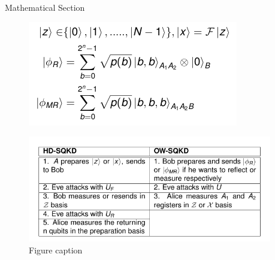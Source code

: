 \documentclass[final]{beamer}
\newlength{\onecolwid}
\newlength{\twocolwid}
\begin{document}
\begin{frame}[t]
\begin{columns}[t]
\begin{column}{\twocolwid}
\begin{columns}[t,totalwidth=\twocolwid]
\begin{column}{\onecolwid} %


\begin{block}{Mathematical Section}

\begin{figure}
	\includegraphics[width=.6\linewidth]{hd_eqns.png}
\end{figure}


\begin{figure}
	\includegraphics[width=\linewidth]{hd_v_ow.png}
	\caption{Figure caption}
\end{figure}


\end{block}


\end{column} %

\begin{column}{\onecolwid} %



\end{column}
\end{columns}
\end{column}
\end{columns}
\end{frame}
\end{document}
